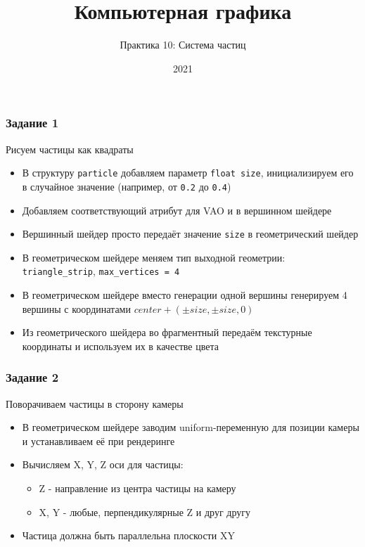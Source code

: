 \documentclass{beamer}
\title{Компьютерная графика}
\subtitle{Практика 10: Система частиц}
\date{2021}
\begin{document}
\frame{\titlepage}

\begin{frame}[fragile]
\frametitle{Задание 1}
Рисуем частицы как квадраты
\begin{itemize}
\item В структуру \verb|particle| добавляем параметр \verb|float size|, инициализируем его в случайное значение (например, от \verb|0.2| до \verb|0.4|)
\pause
\item Добавляем соответствующий атрибут для VAO и в вершинном шейдере
\pause
\item Вершинный шейдер просто передаёт значение \verb|size| в геометрический шейдер
\pause
\item В геометрическом шейдере меняем тип выходной геометрии: \verb|triangle_strip|, \verb|max_vertices = 4|
\pause
\item В геометрическом шейдере вместо генерации одной вершины генерируем 4 вершины с координатами \begin{math}center + (\pm size, \pm size, 0)\end{math}
\pause
\item Из геометрического шейдера во фрагментный передаём текстурные координаты и используем их в качестве цвета
\end{itemize}
\end{frame}

\begin{frame}[fragile]
\frametitle{Задание 2}
Поворачиваем частицы в сторону камеры
\begin{itemize}
\item В геометрическом шейдере заводим uniform-переменную для позиции камеры и устанавливаем её при рендеринге
\pause
\item Вычисляем X, Y, Z оси для частицы:
\begin{itemize}
\item Z - направление из центра частицы на камеру
\item X, Y - любые, перпендикулярные Z и друг другу
\end{itemize}
\pause
\item Частица должна быть параллельна плоскости XY
\end{itemize}
\end{frame}
\end{document}
